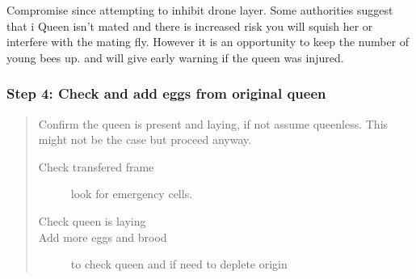 Compromise since attempting to inhibit drone layer.
Some authorities suggest that i
Queen isn't mated and there is increased risk you will squish her or interfere with the mating fly.
However it is an opportunity to keep the number of young bees up.
and will give early warning if the queen was injured.

\subsubsection*{Step 4: Check and add eggs from original queen}

\begin{quotation}
Confirm the queen is present and laying,
if not assume queenless.
This might not be the case but proceed anyway.
\begin{description}
  \item[Check transfered frame] look for emergency cells.
  \item[Check queen is laying] 
  \item[Add more eggs and brood] to check queen and if need to deplete origin
\end{description}
\end{quotation}


